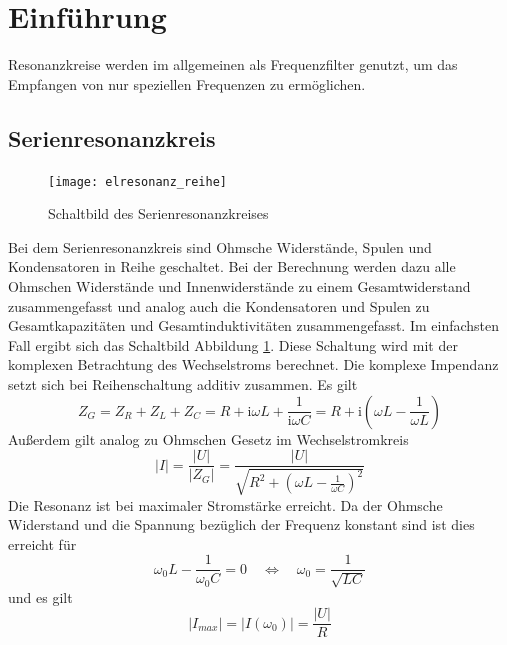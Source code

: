 \section{Einführung}
Resonanzkreise werden im allgemeinen als Frequenzfilter genutzt, um das Empfangen von nur speziellen Frequenzen zu ermöglichen.
\subsection{Serienresonanzkreis}
\begin{figure}[H]
	\centering
	\texttt{[image: elresonanz\_reihe]}
	\caption{Schaltbild des Serienresonanzkreises}
	\label{fig:aufbaureihe}
\end{figure}
Bei dem Serienresonanzkreis sind Ohmsche Widerstände, Spulen und Kondensatoren in Reihe geschaltet. Bei der Berechnung werden dazu alle Ohmschen Widerstände und Innenwiderstände zu einem Gesamtwiderstand zusammengefasst und analog auch die Kondensatoren und Spulen zu Gesamtkapazitäten und Gesamtinduktivitäten zusammengefasst. Im einfachsten Fall ergibt sich das Schaltbild Abbildung \ref{fig:aufbaureihe}. Diese Schaltung wird mit der komplexen Betrachtung des Wechselstroms berechnet. Die komplexe Impendanz setzt sich bei Reihenschaltung additiv zusammen. Es gilt \begin{equation}
	Z_G = Z_R + Z_L + Z_C = R + \mathrm i\omega L + \frac{1}{\mathrm{i}\omega C} = R + \mathrm i \left(\omega L - \frac{1}{\omega L}\right)
\end{equation}
Außerdem gilt analog zu Ohmschen Gesetz im Wechselstromkreis
\begin{equation}
	|I| = \frac{|U|}{|Z_G|} = \frac{|U|}{\sqrt{R^2 + \left(\omega L - \frac{1}{\omega C}\right)^2}}
\end{equation}
Die Resonanz ist bei maximaler Stromstärke erreicht. Da der Ohmsche Widerstand und die Spannung bezüglich der Frequenz konstant sind ist dies erreicht für
\begin{equation}
	\omega_0 L - \frac{1}{\omega_0 C} = 0 \quad \Leftrightarrow \quad \omega_0 = \frac{1}{\sqrt{LC}} \label{eq:resbed}
\end{equation}
und es gilt 
\begin{equation}
	|I_{max}| = |I(\omega_0)| = \frac{|U|}{R}
\end{equation}
